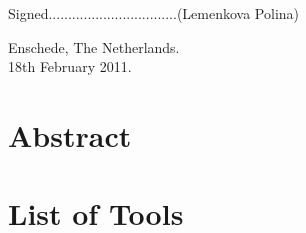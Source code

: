 \documentclass[10pt, a4paper]{article}
\begin{document}
\vspace{1em}

		Signed.................................(Lemenkova Polina) \\

\vspace{1em}

		Enschede, The Netherlands. \\ 18th February 2011.
\pagebreak

\section*{Abstract}
\pagebreak

\section*{List of Tools}\label{sec:0}

	\vspace{2em}
\end{document}
